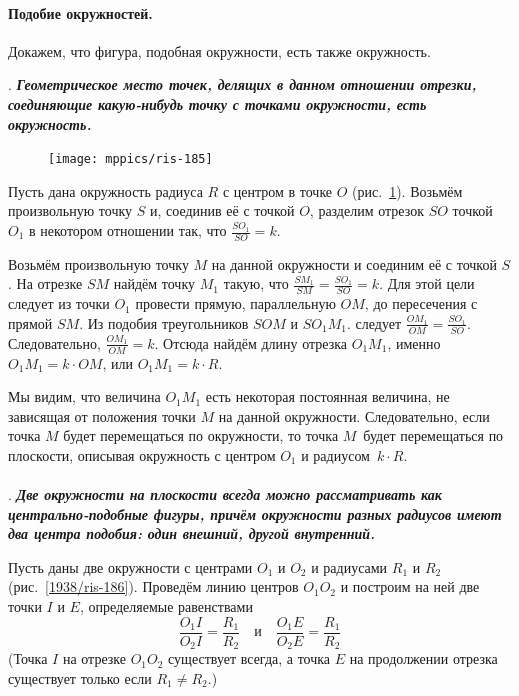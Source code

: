 \documentclass[twoside]{book}
\begin{document}
\paragraph{Подобие окружностей.}\label{1938/178}
Докажем, что фигура, подобная окружности, есть также окружность.


\smallskip
{}.
\textbf{\emph{Геометрическое место точек, делящих в данном отношении отрезки, соединяющие какую-нибудь точку с точками окружности, есть окружность.}}

\begin{figure}[h]
\centering
\texttt{[image: mppics/ris-185]}
\caption{}\label{1938/ris-185}
\end{figure}

Пусть дана окружность радиуса $R$ с центром в точке $O$ (рис.~\ref{1938/ris-185}).
Возьмём произвольную точку $S$ и, соединив её с точкой $O$, разделим отрезок $SO$ точкой $O_1$ в некотором отношении так, что $\frac{SO_1}{SO}= k$.

Возьмём произвольную точку $M$ на данной окружности и соединим её с точкой $S$.
На отрезке $SM$ найдём точку $M_1$ такую, что $\frac{SM_1}{SM}=\frac{SO_1}{SO}= k$.
Для этой цели следует из точки $O_1$ провести прямую, параллельную $OM$, до пересечения с прямой $SM$.
Из подобия треугольников $SOM$ и $SO_1M_1$.
следует $\frac{OM_1}{OM}=\frac{SO_1}{SO}$.
Следовательно, $\frac{OM_1}{OM}=k$.
Отсюда найдём длину отрезка $O_1M_1$, именно $O_1M_1=k\cdot OM$, или $O_1M_1=k\cdot R$.

Мы видим, что величина $O_1M_1$ есть некоторая постоянная величина, не зависящая от положения точки $M$ на данной окружности.
Следовательно, если точка $M$ будет перемещаться по окружности, то точка $M$\ будет перемещаться по плоскости, описывая окружность с центром $O_1$ и радиусом~$k\cdot R$.

\paragraph{}\label{1938/179}
.
\textbf{\emph{Две окружности на плоскости всегда можно рассматривать как центрально-подобные фигуры, причём окружности разных радиусов имеют два центра подобия:
один внешний, другой внутренний.}} 

Пусть даны две окружности с центрами $O_1$ и $O_2$ и радиусами $R_1$ и $R_2$ (рис.~\ref{1938/ris-186}).
Проведём линию центров $O_1O_2$ и построим на ней две точки $I$ и $E$, определяемые равенствами
\[\frac{O_1I}{O_2I}=\frac{R_1}{R_2}\quad\text{и}\quad\frac{O_1E}{O_2E}=\frac{R_1}{R_2}\]
(Точка $I$ на отрезке $O_1O_2$ существует всегда, а точка $E$ на продолжении отрезка существует только если $R_1\ne R_2$.)
\end{document}
